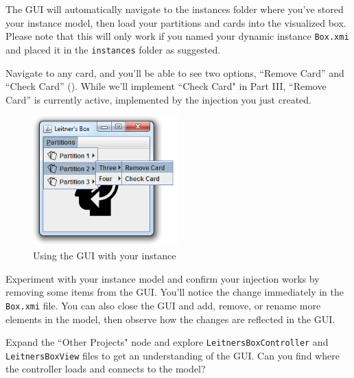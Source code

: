 \begin{stepbystep}
\item The GUI will automatically navigate to the instances folder where you've stored your instance model, then load your partitions and
cards into the visualized box. Please note that this will only work if you named your dynamic instance \texttt{Box.xmi} and placed it in the \texttt{instances}
folder as suggested.

\vspace{0.5cm}

\item Navigate to any card, and you'll be able to see two options, ``Remove Card'' and ``Check Card''
(). While we'll implement ``Check Card" in Part III, ``Remove Card'' is currently active, implemented by the injection you
just created.

\vspace{1cm}

\begin{figure}[htbp]
    \centering
    \includegraphics[width=0.5\textwidth]{../../org.moflon.doc.handbook.02_leitnersLearningBox/6_LLBGui/guiImages/eclipse_GUICardOptions}
    \caption{Using the GUI with your instance}
    \label{eclipse:GUI_cardOptions}
\end{figure}

\vspace{1cm}

\item Experiment with your instance model and confirm your injection works by removing some items from the GUI.  You'll notice the change
immediately in the \texttt{Box.xmi} file. You can also close the GUI and add, remove, or rename more elements in the model, then observe how the changes are
reflected in the GUI.

\vspace{0.5cm}

\item Expand the ``Other Projects" node and explore \texttt{LeitnersBoxController} and \texttt{LeitnersBoxView} files to get an
understanding of the GUI. Can you find where the controller loads and connects to the model?

\end{stepbystep}
